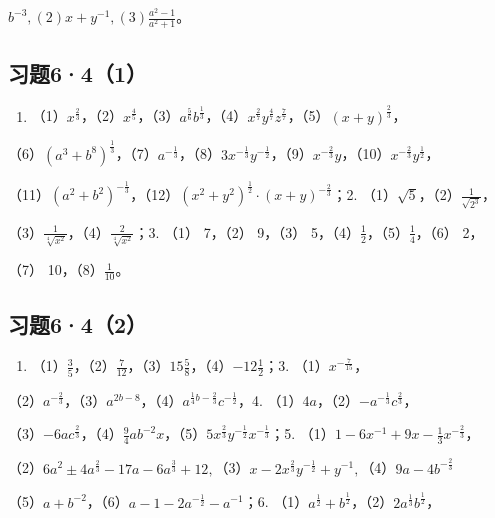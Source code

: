 \(b^{-3}, (2) x + y^{-1}, (3) \frac{a^2 - 1}{a^2 + 1}\)。

\subsection{习题6·4（1）}

\begin{enumerate}
\item
  （1）\(x^{\frac{2}{3}}\)，（2）\(x^{\frac{4}{5}}\)，（3）\(a^{\frac{5}{6}}b^{\frac{1}{3}}\)，（4）\(x^{\frac{2}{7}}y^{\frac{4}{7}}z^{\frac{7}{7}}\)，（5）\((x + y)^{\frac{2}{3}}\)，
\end{enumerate}

（6）\((a^3 + b^8)^{\frac{1}{3}}\)，（7）\(a^{-\frac{1}{3}}\)，（8）\(3x^{-\frac{1}{3}}y^{-\frac{1}{2}}\)，（9）\(x^{-\frac{2}{3}}y\)，（10）\(x^{-\frac{2}{3}}y^{\frac{1}{2}}\)，

（11）\((a^2 + b^2)^{-\frac{1}{3}}\)，（12）\((x^2 + y^2)^{\frac{1}{2}} \cdot (x + y)^{-\frac{2}{3}}\)；2.
（1）\(\sqrt{5}\)，（2）\(\frac{1}{\sqrt{2^3}}\)，

（3）\(\frac{1}{\sqrt[4]{x^2}}\)，（4）\(\frac{2}{\sqrt[4]{x^2}}\)；3.
（1） 7，（2） 9，（3）
5，（4）\(\frac{1}{2}\)，（5）\(\frac{1}{4}\)，（6） 2，

（7） 10，（8）\(\frac{1}{10}\)。

\subsection{习题6·4（2）}

\begin{enumerate}[start=2]
\item
  （1）\(\frac{3}{5}\)，（2）\(\frac{7}{12}\)，（3）\(15\frac{5}{8}\)，（4）\(-12\frac{1}{2}\)；3.
  （1）\(x^{-\frac{7}{15}}\)，
\end{enumerate}

（2）\(a^{-\frac{2}{3}}\)，（3）\(a^{2b - 8}\)，（4）\(a^{\frac{1}{4}b - \frac{2}{3}}c^{-\frac{1}{2}}\)，4.
（1）\(4a\)，（2）\(-a^{-\frac{1}{3}}c^{\frac{2}{3}}\)，

（3）\(-6ac^{\frac{2}{3}}\)，（4）\(\frac{9}{4}ab^{-2}x\)，（5）\(5x^{\frac{2}{3}}y^{-\frac{1}{2}}x^{-\frac{1}{3}}\)；5.
（1）\(1 - 6x^{-1} + 9x - \frac{1}{3}x^{-\frac{2}{3}}\)，

（2）\(6a^{2} \pm 4a^{\frac{2}{3}} - 17a - 6a^{\frac{3}{3}} + 12,\)（3）\(x - 2x^{\frac{2}{3}}y^{-\frac{1}{2}} + y^{-1},\)（4）\(9a - 4b^{-\frac{2}{3}}\)

（5）\(a + b^{-2}\)，（6）\(a - 1 - 2a^{-\frac{1}{2}} - a^{-1}\)；6.
（1）\(a^{\frac{1}{2}} + b^{\frac{1}{2}}\)，（2）\(2a^{\frac{1}{3}}b^{\frac{1}{2}}\)，

